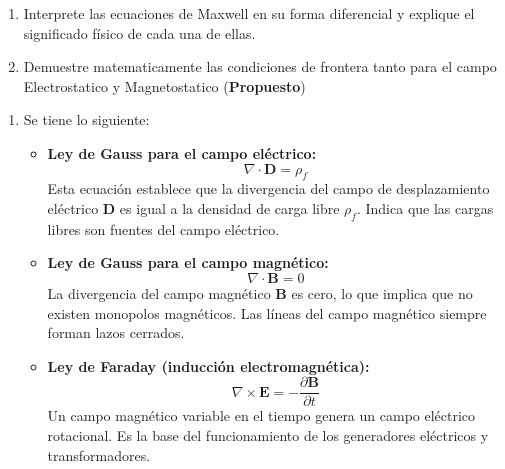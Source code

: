 \documentclass[
  11pt,
  letterpaper,
   addpoints,
   answers
  ]{exam}
\begin{document}
\begin{questions}
    \question     
    \begin{enumerate}
        \item Interprete las ecuaciones de Maxwell en su forma diferencial y explique el significado físico de cada una de ellas.
        \item Demuestre matematicamente las condiciones de frontera tanto para el campo Electrostatico y Magnetostatico (\textbf{Propuesto})
    \end{enumerate}
    \begin{solution}
        \begin{enumerate}
            \item Se tiene lo siguiente:
        \begin{itemize}
            \item \textbf{Ley de Gauss para el campo eléctrico:}
            \begin{equation}
                \nabla \cdot \mathbf{D} = \rho_f
            \end{equation}
            Esta ecuación establece que la divergencia del campo de desplazamiento eléctrico \( \mathbf{D} \) es igual a la densidad de carga libre \( \rho_f \). Indica que las cargas libres son fuentes del campo eléctrico.
        
            \item \textbf{Ley de Gauss para el campo magnético:}
            \begin{equation}
                \nabla \cdot \mathbf{B} = 0
            \end{equation}
            La divergencia del campo magnético \( \mathbf{B} \) es cero, lo que implica que no existen monopolos magnéticos. Las líneas del campo magnético siempre forman lazos cerrados.
        
            \item \textbf{Ley de Faraday (inducción electromagnética):}
            \begin{equation}
                \nabla \times \mathbf{E} = -\frac{\partial \mathbf{B}}{\partial t}
            \end{equation}
            Un campo magnético variable en el tiempo genera un campo eléctrico rotacional. Es la base del funcionamiento de los generadores eléctricos y transformadores.
        

\end{itemize}
\end{enumerate}
\end{solution}
\end{questions}
\end{document}
